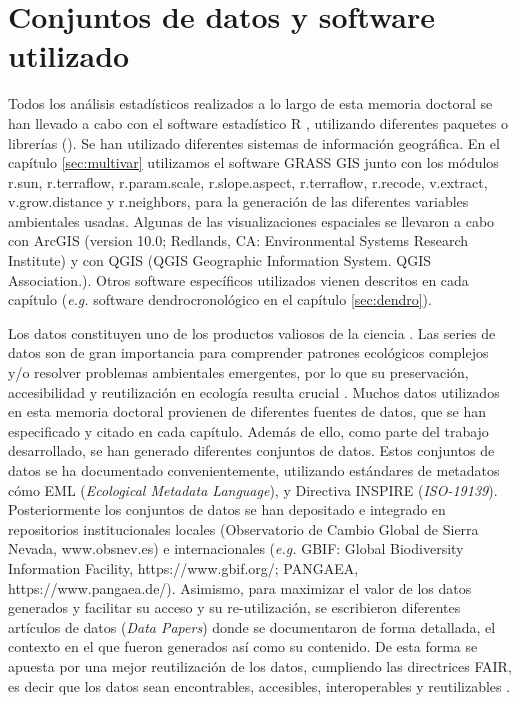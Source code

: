\section{Conjuntos de datos y software utilizado}\label{sec:metodologia:datos}

Todos los análisis estadísticos realizados a lo largo de esta memoria doctoral se han llevado a cabo con el software estadístico R \autocite{base}, utilizando diferentes paquetes o librerías (). Se han utilizado diferentes sistemas de información geográfica. En el capítulo \ref{sec:multivar} utilizamos el software GRASS GIS \autocite{Neteleretal2012GRASSGIS} junto con los módulos r.sun, r.terraflow, r.param.scale, r.slope.aspect, r.terraflow, r.recode, v.extract, v.grow.distance y r.neighbors, para la generación de las diferentes variables ambientales usadas. Algunas de las visualizaciones espaciales se llevaron a cabo con ArcGIS (version 10.0; Redlands, CA: Environmental Systems Research Institute) y con QGIS (QGIS Geographic Information System. QGIS Association.). Otros software específicos utilizados vienen descritos en cada capítulo (\emph{e.g.} software dendrocronológico en el capítulo \ref{sec:dendro}). 

Los datos constituyen uno de los productos valiosos de la ciencia \autocite{Costelloetal2013BiodiversityData}. Las series de datos son de gran importancia para comprender patrones ecológicos complejos y/o resolver problemas ambientales emergentes, por lo que su preservación, accesibilidad y reutilización en ecología resulta crucial \autocite{PerezLuqueRosCandeira2019CompartiendoDatos}. Muchos datos utilizados en esta memoria doctoral provienen de diferentes fuentes de datos, que se han especificado y citado en cada capítulo. Además de ello, como parte del trabajo desarrollado, se han generado diferentes conjuntos de datos. Estos conjuntos de datos se ha documentado convenientemente, utilizando estándares de metadatos cómo EML (\emph{Ecological Metadata Language}), y Directiva INSPIRE (\emph{ISO-19139}). Posteriormente los conjuntos de datos se han depositado e integrado en repositorios institucionales locales (Observatorio de Cambio Global de Sierra Nevada, www.obsnev.es) e internacionales (\emph{e.g.} GBIF: Global
Biodiversity Information Facility, https://www.gbif.org/; PANGAEA, https://www.pangaea.de/). Asimismo, para maximizar el valor de los datos generados y facilitar su acceso y su re-utilización, se escribieron diferentes artículos de datos (\emph{Data Papers}) donde se documentaron de forma detallada, el contexto en el que fueron generados así como su contenido. De esta forma se apuesta por una mejor reutilización de los datos, cumpliendo las directrices FAIR, es decir que los datos sean encontrables, accesibles, interoperables y reutilizables \autocite{Wilkinsonetal2016FAIRGuiding}.


